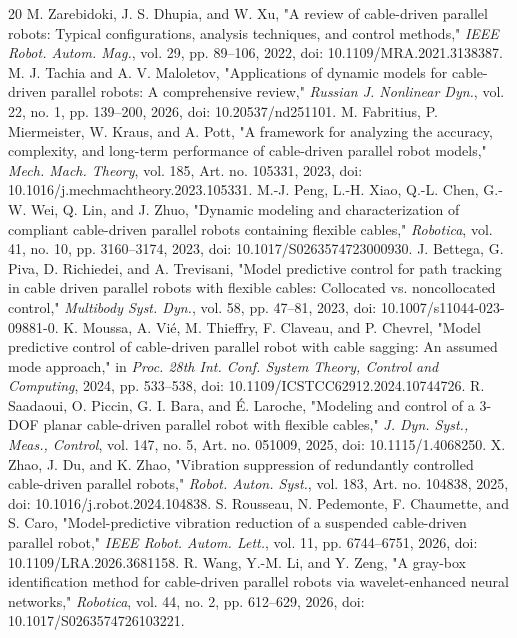 \documentclass[conference]{IEEEtran}
\begin{document}
\begin{thebibliography}{20}
 M. Zarebidoki, J. S. Dhupia, and W. Xu, "A review of cable-driven parallel robots: Typical configurations, analysis techniques, and control methods," \emph{IEEE Robot. Autom. Mag.}, vol. 29, pp. 89--106, 2022, doi: 10.1109/MRA.2021.3138387.
 M. J. Tachia and A. V. Maloletov, "Applications of dynamic models for cable-driven parallel robots: A comprehensive review," \emph{Russian J. Nonlinear Dyn.}, vol. 22, no. 1, pp. 139--200, 2026, doi: 10.20537/nd251101.
 M. Fabritius, P. Miermeister, W. Kraus, and A. Pott, "A framework for analyzing the accuracy, complexity, and long-term performance of cable-driven parallel robot models," \emph{Mech. Mach. Theory}, vol. 185, Art. no. 105331, 2023, doi: 10.1016/j.mechmachtheory.2023.105331.
 M.-J. Peng, L.-H. Xiao, Q.-L. Chen, G.-W. Wei, Q. Lin, and J. Zhuo, "Dynamic modeling and characterization of compliant cable-driven parallel robots containing flexible cables," \emph{Robotica}, vol. 41, no. 10, pp. 3160--3174, 2023, doi: 10.1017/S0263574723000930.
 J. Bettega, G. Piva, D. Richiedei, and A. Trevisani, "Model predictive control for path tracking in cable driven parallel robots with flexible cables: Collocated vs. noncollocated control," \emph{Multibody Syst. Dyn.}, vol. 58, pp. 47--81, 2023, doi: 10.1007/s11044-023-09881-0.
 K. Moussa, A. Vié, M. Thieffry, F. Claveau, and P. Chevrel, "Model predictive control of cable-driven parallel robot with cable sagging: An assumed mode approach," in \emph{Proc. 28th Int. Conf. System Theory, Control and Computing}, 2024, pp. 533--538, doi: 10.1109/ICSTCC62912.2024.10744726.
 R. Saadaoui, O. Piccin, G. I. Bara, and É. Laroche, "Modeling and control of a 3-DOF planar cable-driven parallel robot with flexible cables," \emph{J. Dyn. Syst., Meas., Control}, vol. 147, no. 5, Art. no. 051009, 2025, doi: 10.1115/1.4068250.
 X. Zhao, J. Du, and K. Zhao, "Vibration suppression of redundantly controlled cable-driven parallel robots," \emph{Robot. Auton. Syst.}, vol. 183, Art. no. 104838, 2025, doi: 10.1016/j.robot.2024.104838.
 S. Rousseau, N. Pedemonte, F. Chaumette, and S. Caro, "Model-predictive vibration reduction of a suspended cable-driven parallel robot," \emph{IEEE Robot. Autom. Lett.}, vol. 11, pp. 6744--6751, 2026, doi: 10.1109/LRA.2026.3681158.
 R. Wang, Y.-M. Li, and Y. Zeng, "A gray-box identification method for cable-driven parallel robots via wavelet-enhanced neural networks," \emph{Robotica}, vol. 44, no. 2, pp. 612--629, 2026, doi: 10.1017/S0263574726103221.

\end{thebibliography}
\end{document}
